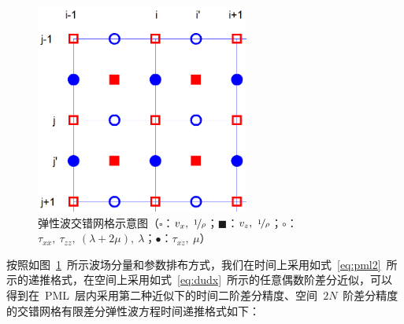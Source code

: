 \documentclass[UTF8]{ctexart}
\begin{document}
\begin{figure}[t]
  \centering
  \includegraphics[width=70mm]{./Figure/esg.png}
  \caption{弹性波交错网格示意图（{\color{red}$\square$}：$v_x,~\nicefrac{1}{\rho}$；{\color{red}$\blacksquare$}：$v_z,~\nicefrac{1}{\rho}$；{\color{blue}$\circ$}：$\tau_{xx},~\tau_{zz},~(\lambda+2\mu),~\lambda$；{\color{blue}$\bullet$}：$\tau_{xz},~\mu$）}\label{fig:esg}
\end{figure}
按照如图~\ref{fig:esg}~所示波场分量和参数排布方式，我们在时间上采用如式~\eqref{eq:pml2}~所示的递推格式，在空间上采用如式~\eqref{eq:dudx}~所示的任意偶数阶差分近似，可以得到在~PML~层内采用第二种近似下的时间二阶差分精度、空间~$2N$~阶差分精度的交错网格有限差分弹性波方程时间递推格式如下：
\end{document}
